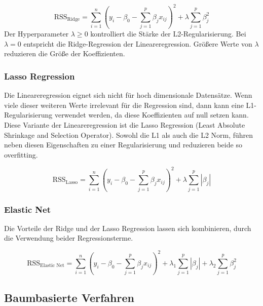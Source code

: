 \begin{equation}
\text{RSS}_{\text{Ridge}} = \sum_{i=1}^{n}(y_i - \beta_0 - \sum_{j=1}^{p}\beta_j x_{ij})^2 + \lambda \sum_{j=1}^{p}\beta_j^2
\label{eq:rss-ridge}
\end{equation}
Der Hyperparameter \(\lambda \geq 0\) kontrolliert die Stärke der L2-Regularisierung. Bei \(\lambda = 0\) entspricht die Ridge-Regression der Lineareregression. Größere Werte von \(\lambda \) reduzieren die Größe der Koeffizienten.

\subsubsection{Lasso Regression}
Die Lineareregression eignet sich nicht für hoch dimensionale Datensätze. Wenn viele dieser weiteren Werte irrelevant für die Regression sind, dann kann eine L1-Regularisierung verwendet werden, da diese Koeffizienten auf null setzen kann. Diese Variante der Lineareregression ist die Lasso Regression (Least Absolute Shrinkage and Selection Operator). Sowohl die L1 als auch die L2 Norm, führen neben diesen Eigenschaften zu einer Regularisierung und reduzieren beide so overfitting.

\begin{equation}
\text{RSS}_{\text{Lasso}} = \sum_{i=1}^{n}(y_i - \beta_0 - \sum_{j=1}^{p}\beta_j x_{ij})^2 + \lambda \sum_{j=1}^{p}|\beta_j|
\label{eq:reg-lasso}
\end{equation}

\subsubsection{Elastic Net}
Die Vorteile der Ridge und der Lasso Regression lassen sich kombinieren, durch die Verwendung beider Regressionsterme.

\begin{equation}
\text{RSS}_{\text{Elastic Net}} = \sum_{i=1}^{n}(y_i - \beta_0 - \sum_{j=1}^{p}\beta_j x_{ij})^2 + \lambda_1 \sum_{j=1}^{p}|\beta_j| + \lambda_2 \sum_{j=1}^{p}\beta_j^2
\label{eq:reg-elastic}
\end{equation}

\subsection{Baumbasierte Verfahren}


